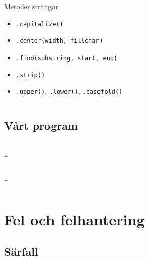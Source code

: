 \begin{frame}
  \begin{example}
    \inputminted[linenos]{python}{examples/strop.py}
  \end{example}
\end{frame}

\begin{frame}
  \begin{block}{Metoder strängar}
    \begin{itemize}
      \item \texttt{.capitalize()}
      \item \texttt{.center(width, fillchar)}
      \item \texttt{.find(substring, start, end)}
      \item \texttt{.strip()}
      \item \texttt{.upper()}, \texttt{.lower()}, \texttt{.casefold()}
    \end{itemize}
  \end{block}
\end{frame}

\begin{frame}
  \begin{example}
    \inputminted[linenos]{python}{examples/strmeth.py}
  \end{example}
\end{frame}

\subsection{Vårt program}

\begin{frame}[fragile]
  \inputminted[linenos,firstline=12,lastline=14,highlightlines=14]{python}{examples/age-funcs-input.py}
  \dots
  \inputminted[linenos,firstline=20,lastline=25]{python}{examples/age-funcs-input.py}
  \dots
  \inputminted[linenos,firstline=37,highlightlines=39]{python}{examples/age-funcs-input.py}
\end{frame}


\section{Fel och felhantering}

\subsection{Särfall}

